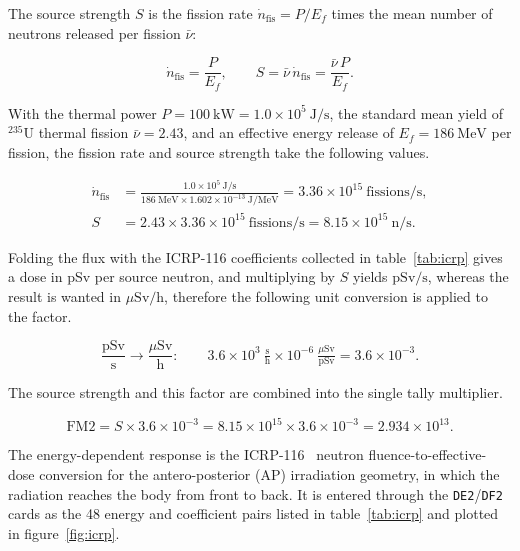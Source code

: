 The source strength $S$ is the fission rate $\dot{n}_{\mathrm{fis}}=P/E_f$ times the mean number of neutrons released per fission $\bar{\nu}$:

\begin{equation}
  \dot{n}_{\mathrm{fis}} = \frac{P}{E_f}, \qquad
  S = \bar{\nu}\,\dot{n}_{\mathrm{fis}} = \frac{\bar{\nu}\,P}{E_f}.
\end{equation}

With the thermal power $P=100~\mathrm{kW}=1.0\times10^{5}~\mathrm{J/s}$, the standard mean yield of $^{235}\mathrm{U}$ thermal fission $\bar{\nu}=2.43$, and an effective energy release of $E_f=186~\mathrm{MeV}$ per fission, the fission rate and source strength take the following values.

\begin{equation}
\begin{aligned}
  \dot{n}_{\mathrm{fis}}
    &= \frac{1.0\times10^{5}~\mathrm{J/s}}
            {186~\mathrm{MeV}\times1.602\times10^{-13}~\mathrm{J/MeV}}
     = 3.36\times10^{15}~\mathrm{fissions/s}, \\[2pt]
  S &= 2.43\times3.36\times10^{15}~\mathrm{fissions/s}
     = 8.15\times10^{15}~\mathrm{n/s}.
\end{aligned}
\end{equation}

Folding the flux with the ICRP-116 coefficients collected in table~\ref{tab:icrp} gives a dose in pSv per source neutron, and multiplying by $S$ yields $\mathrm{pSv/s}$, whereas the result is wanted in $\mu\mathrm{Sv/h}$, therefore the following unit conversion is applied to the factor.

\begin{equation}
  \frac{\mathrm{pSv}}{\mathrm{s}} \longrightarrow \frac{\mu\mathrm{Sv}}{\mathrm{h}}:
  \qquad
  3.6\times10^{3}~\tfrac{\mathrm{s}}{\mathrm{h}}
  \times
  10^{-6}~\tfrac{\mu\mathrm{Sv}}{\mathrm{pSv}}
  = 3.6\times10^{-3}.
\end{equation}

The source strength and this factor are combined into the single tally multiplier.

\begin{equation}
  \mathrm{FM2} = S\times 3.6\times10^{-3}
    = 8.15\times10^{15}\times 3.6\times10^{-3}
    = 2.934\times10^{13}.
\end{equation}

The energy-dependent response is the ICRP-116~\cite{icrp} neutron fluence-to-effective-dose conversion for the antero-posterior (AP) irradiation geometry, in which the radiation reaches the body from front to back.
It is entered through the \texttt{DE2}/\texttt{DF2} cards as the 48 energy and coefficient pairs listed in table~\ref{tab:icrp} and plotted in figure~\ref{fig:icrp}.

